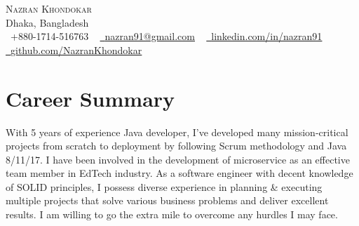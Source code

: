 \documentclass[letterpaper,11pt]{article}
\begin{document}

\begin{center}
    {\Huge \scshape Nazran Khondokar} \\ \vspace{1pt}
    Dhaka, Bangladesh \\ \vspace{1pt}
    \small \raisebox{-0.1\height}\faPhone\ +880-1714-516763 ~ \href{mailto:nazran91@gmail.com}{\raisebox{-0.2\height}\faEnvelope\  \underline{nazran91@gmail.com}} ~ 
    \href{https://www.linkedin.com/in/nazran91/}{\raisebox{-0.2\height}\faLinkedin\ \underline{linkedin.com/in/nazran91}}  ~
    \href{https://github.com/NazranKhondokar/}{\raisebox{-0.2\height}\faGithub\ \underline{github.com/NazranKhondokar}}
    \vspace{-8pt}
\end{center}

\section{Career Summary}
With 5 years of experience Java developer, I’ve developed many mission-critical projects from scratch to deployment by following Scrum methodology and Java 8/11/17. I have been involved in the development of microservice as an effective team member in EdTech industry. As a software engineer with decent knowledge of SOLID principles, I possess diverse experience in planning \& executing multiple projects that solve various business problems and deliver excellent results. I am willing to go the extra mile to overcome any hurdles I may face.
            

%
\end{document}
